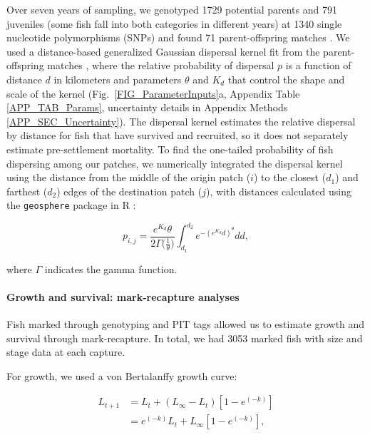 \documentclass[12pt, oneside]{article}   	%
\begin{document}
Over seven years of sampling, we genotyped 1729 potential parents and 791 juveniles (some fish fall into both categories in different years) at 1340 single nucleotide polymorphisms (SNPs) and found 71 parent-offspring matches \citep{catalanoInPrepconnectivity}. We used a distance-based generalized Gaussian dispersal kernel fit from the parent-offspring matches \citep{catalanoInPrepconnectivity, bode2018estimating}, where the relative probability of dispersal $p$ is a function of distance $d$ in kilometers and parameters $\theta$ and $K_d$ that control the shape and scale of the kernel (Fig.\ \ref{FIG_ParameterInputs}a, Appendix Table \ref{APP_TAB_Params}, uncertainty details in Appendix Methods \ref{APP_SEC_Uncertainty}). The dispersal kernel estimates the relative dispersal by distance for fish that have survived and recruited, so it does not separately estimate pre-settlement mortality. To find the one-tailed probability of fish dispersing among our patches, we numerically integrated the dispersal kernel using the distance from the middle of the origin patch ($i$) to the closest ($d_1$) and farthest ($d_2$) edges of the destination patch ($j$), with distances calculated using the \texttt{geosphere} package in R \citep{geosphere2017R}:

\begin{equation} 
p_{i,j} = \frac{e^{K_d}\theta}{2\Gamma({\frac{1}{\theta})}} \int_{d_1}^{d_2}e^{-(e^{K_d}d)^\theta}  dd, \label{EQN_integratingDK}
\end{equation}

where $\Gamma$ indicates the gamma function.

\paragraph*{Growth and survival: mark-recapture analyses}

Fish marked through genotyping and PIT tags allowed us to estimate growth and survival through mark-recapture. In total, we had 3053 marked fish with size and stage data at each capture. 

For growth, we used a von Bertalanffy growth curve:

\begin{equation} \label{EQN_VBL} 
\begin{split}
L_{t+1} & = L_t + (L_\infty - L_t)[1 - e^{(-k)}] \\
 & = e^{(-k)}L_t + L_\infty[1 - e^{(-k)}],
\end{split}
\end{equation}
\end{document}
